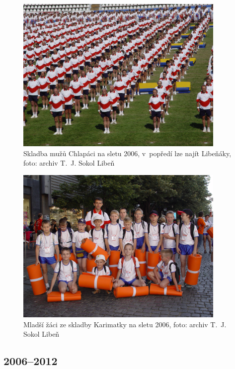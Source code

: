 \documentclass[a5paper, 11pt, twoside]{article}
\begin{document}
\begin{figure}[h]
  \centering 
  \includegraphics[width=0.9\textwidth]{img/55_chalpaci.JPG}
  \caption*{Skladba mužů Chlapáci na sletu 2006, v~popředí lze najít Libeňáky,
  foto: archiv T.~J. Sokol Libeň}
\end{figure}

\begin{figure}[h]
  \centering 
  \includegraphics[width=0.9\textwidth]{img/56_karimatky.JPG}
  \caption*{Mladší žáci ze skladby Karimatky na sletu 2006, foto: archiv T.~J.
  Sokol Libeň}
\end{figure}


\clearpage
\subsection{2006--2012}
\end{document}
